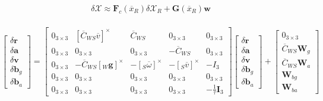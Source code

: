 \documentclass[11pt,twoside]{report}
\begin{document}
\begin{equation}
\begin{aligned}
\delta \mathcal{X} \approx  \textbf{F}_{c} (\overline{x}_{R}) \delta \mathcal{X}_{R} + \textbf{G}(\overline{x}_{R})\textbf{w} \\
\end{aligned}
\end{equation}

\begin{equation}
\begin{bmatrix}
\delta \textbf{\.r}  \\[0.3em]
\delta \textbf{\.a} \\[0.3em]
\delta \textbf{\.v} \\[0.3em]
\delta \textbf{\.b}_{g} \\[0.3em]
\delta \textbf{\.b}_{a}
\end{bmatrix}
=
\begin{bmatrix}
0_{3 \times 3} &  [\overline{C}_{WS}\overline{v}]^{\times}
& \overline{C}_{WS} &  0_{3 \times 3} &  0_{3 \times 3}\\

0_{3 \times 3} & 0_{3 \times 3} 
& 0_{3 \times 3} &  -\overline{C}_{WS} &  0_{3 \times 3}\\

0_{3 \times 3} & -\overline{C}_{WS}[_{W}\textbf{g}]^{\times}
& -[_{S}\overline{\omega}]^{\times} &  -[_{S}\overline{v}]^{\times} &  -I_{3}\\

0_{3 \times 3} & 0_{3 \times 3}
& 0_{3 \times 3} &  0_{3 \times 3} &  0_{3 \times 3}\\

0_{3 \times 3} & 0_{3 \times 3} 
& 0_{3 \times 3} &  0_{3 \times 3} &  -\frac{1}{\tau}\textbf{I}_{3}
\end{bmatrix}
\begin{bmatrix}
\delta \textbf{r}  \\[0.3em]
\delta \textbf{a} \\[0.3em]
\delta \textbf{v} \\[0.3em]
\delta \textbf{b}_{g} \\[0.3em]
\delta \textbf{b}_{a}
\end{bmatrix}
+
\begin{bmatrix}
0_{3 \times 3}  \\[0.3em]
\overline{C}_{WS} \textbf{W}_{g} \\[0.3em]
\overline{C}_{WS} \textbf{W}_{a} \\[0.3em]
\textbf{W}_{bg} \\[0.3em]
\textbf{W}_{ba}
\end{bmatrix}
\end{equation}
\end{document}
